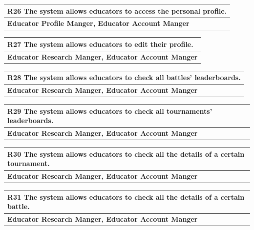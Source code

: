 \documentclass[12pt, a4paper]{report}
\begin{document}
\begin{table}[H]
    \begin{tabularx}{\textwidth}{X}
    \textbf{R26} The system allows educators to access the personal profile.\\
    \hline 
    \textbf{Educator Profile Manger, Educator Account Manger}
\end{tabularx}
\end{table}

\begin{table}[H]
    \begin{tabularx}{\textwidth}{X}
    \textbf{R27} The system allows educators to edit their profile.\\
    \hline 
    \textbf{Educator Research Manger, Educator Account Manger}
    \end{tabularx}
\end{table}

\begin{table}[H]
    \begin{tabularx}{\textwidth}{X}
    \textbf{R28} The system allows educators to check all battles' leaderboards.\\
    \hline 
    \textbf{Educator Research Manger, Educator Account Manger}
    \end{tabularx}
\end{table}

\begin{table}[H]
    \begin{tabularx}{\textwidth}{X}
    \textbf{R29} The system allows educators to check all tournaments' leaderboards.\\
    \hline 
    \textbf{Educator Research Manger, Educator Account Manger}
    \end{tabularx}
\end{table}

\begin{table}[H]
    \begin{tabularx}{\textwidth}{X}
    \textbf{R30} The system allows educators to check all the details of a certain tournament.\\
    \hline 
    \textbf{Educator Research Manger, Educator Account Manger}
    \end{tabularx}
\end{table}

\begin{table}[H]
    \begin{tabularx}{\textwidth}{X}
    \textbf{R31} The system allows educators to check all the details of a certain battle.\\
    \hline 
    \textbf{Educator Research Manger, Educator Account Manger}
    \end{tabularx}
\end{table}
\end{document}

